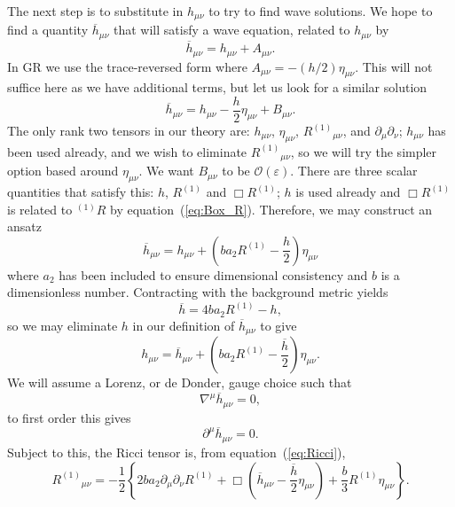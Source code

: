\documentclass[a4paper, 11pt, titlepage, twoside]{report}
\newcommand{\eqnref}[1]{equation~(\ref{eq:#1})}
\newcommand{\order}[1]{\ensuremath{\mathcal{O}({#1})}}
\begin{document}
The next step is to substitute in $h_{\mu\nu}$ to try to find wave solutions. We hope to find a quantity $\overline{h}_{\mu\nu}$ that will satisfy a wave equation, related to $h_{\mu\nu}$ by
\begin{equation}
\overline{h}_{\mu\nu} = h_{\mu\nu} + A_{\mu\nu}.
\end{equation}
In GR we use the trace-reversed form where $A_{\mu\nu} = -(h/2)\eta_{\mu\nu}$. This will not suffice here as we have additional terms, but let us look for a similar solution
\begin{equation}
\overline{h}_{\mu\nu} = h_{\mu\nu} - \frac{h}{2}\eta_{\mu\nu} + B_{\mu\nu}.
\end{equation}
The only rank two tensors in our theory are: $h_{\mu\nu}$, $\eta_{\mu\nu}$, ${R^{(1)}}_{\mu\nu}$, and $\partial_\mu\partial_\nu$; $h_{\mu\nu}$ has been used already, and we wish to eliminate ${R^{(1)}}_{\mu\nu}$, so we will try the simpler option based around $\eta_{\mu\nu}$. We want $B_{\mu\nu}$ to be $\order{\varepsilon}$. There are three scalar quantities that satisfy this: $h$, $R^{(1)}$ and $\Box R^{(1)}$; $h$ is used already and $\Box R^{(1)}$ is related to $^{(1)}R$ by \eqnref{Box_R}. Therefore, we may construct an ansatz
\begin{equation}
\overline{h}_{\mu\nu} = h_{\mu\nu} + \left(b a_2 R^{(1)} - \frac{h}{2}\right)\eta_{\mu\nu}
\label{eq:Ansatz}
\end{equation}
where $a_2$ has been included to ensure dimensional consistency and $b$ is a dimensionless number. Contracting with the background metric yields
\begin{equation}
\overline{h} = 4b a_2 R^{(1)} - h,
\label{eq:h_trace}
\end{equation}
so we may eliminate $h$ in our definition of $\overline{h}_{\mu\nu}$ to give
\begin{equation}
h_{\mu\nu} = \overline{h}_{\mu\nu} + \left(b a_2 R^{(1)} -\frac{\overline{h}}{2}\right)\eta_{\mu\nu}.
\end{equation}
We will assume a Lorenz, or de Donder, gauge choice such that
\begin{equation}
\nabla^\mu \overline{h}_{\mu\nu} = 0,
\label{eq:Lorenz}
\end{equation}
to first order this gives
\begin{equation}
\partial^\mu \overline{h}_{\mu\nu} = 0.
\end{equation}
Subject to this, the Ricci tensor is, from \eqnref{Ricci},
\begin{equation}
{R^{(1)}}_{\mu\nu} = -\frac{1}{2}\left\{2b a_2 \partial_\mu\partial_\nu R^{(1)} + \Box\left(\overline{h}_{\mu\nu} -\frac{\overline{h}}{2}\eta_{\mu\nu}\right) + \frac{b}{3}R^{(1)}\eta_{\mu\nu}\right\}.
\end{equation}
\end{document}
